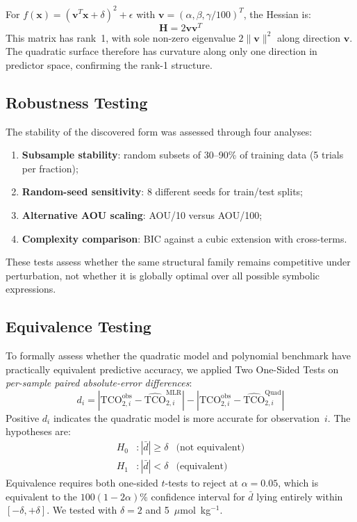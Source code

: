 \documentclass[12pt,a4paper]{article}
\begin{document}
For $f(\mathbf{x}) = (\mathbf{v}^T\mathbf{x} + \delta)^2 + \epsilon$ with $\mathbf{v} = (\alpha, \beta, \gamma/100)^T$, the Hessian is:
\begin{equation}
\mathbf{H} = 2\mathbf{v}\mathbf{v}^T
\label{eq:hessian}
\end{equation}
This matrix has rank~1, with sole non-zero eigenvalue $2\|\mathbf{v}\|^2$ along direction $\mathbf{v}$. The quadratic surface therefore has curvature along only one direction in predictor space, confirming the rank-1 structure.

\subsection{Robustness Testing}
\label{sec:robustness}

The stability of the discovered form was assessed through four analyses:

\begin{enumerate}[nosep]
    \item \textbf{Subsample stability}: random subsets of 30--90\% of training data (5 trials per fraction);
    \item \textbf{Random-seed sensitivity}: 8 different seeds for train/test splits;
    \item \textbf{Alternative AOU scaling}: AOU/10 versus AOU/100;
    \item \textbf{Complexity comparison}: BIC against a cubic extension with cross-terms.
\end{enumerate}
These tests assess whether the same structural family remains competitive under perturbation, not whether it is globally optimal over all possible symbolic expressions.

\subsection{Equivalence Testing}

To formally assess whether the quadratic model and polynomial benchmark have practically equivalent predictive accuracy, we applied Two One-Sided Tests \citep[TOST;][]{Schuirmann1987} on \emph{per-sample paired absolute-error differences}:
\begin{equation}
d_i = |\text{TCO}_{2,i}^{\text{obs}} - \hat{\text{TCO}}_{2,i}^{\text{MLR}}| - |\text{TCO}_{2,i}^{\text{obs}} - \hat{\text{TCO}}_{2,i}^{\text{Quad}}|
\label{eq:tost_diff}
\end{equation}
Positive $d_i$ indicates the quadratic model is more accurate for observation~$i$. The hypotheses are:
\begin{align}
H_0&: |\bar{d}| \geq \delta & \text{(not equivalent)} \label{eq:tost_h0}\\
H_1&: |\bar{d}| < \delta & \text{(equivalent)} \label{eq:tost_h1}
\end{align}
Equivalence requires both one-sided $t$-tests to reject at $\alpha = 0.05$, which is equivalent to the $100(1-2\alpha)\%$ confidence interval for $\bar{d}$ lying entirely within $[-\delta, +\delta]$. We tested with $\delta = 2$ and 5~$\mu$mol~kg$^{-1}$.
\end{document}
